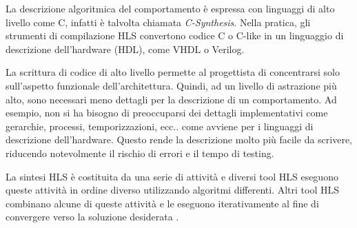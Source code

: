La descrizione algoritmica del comportamento è espressa con linguaggi di alto livello come C, infatti è talvolta chiamata \textit{C-Synthesis}. Nella pratica, gli strumenti di compilazione HLS convertono codice C o C-like in un linguaggio di descrizione dell'hardware (HDL), come VHDL o Verilog. 

La scrittura di codice di alto livello permette al progettista di concentrarsi solo sull'aspetto funzionale dell'architettura. Quindi, ad un livello di astrazione più alto, sono necessari meno dettagli per la descrizione di un comportamento. Ad esempio, non si ha bisogno di preoccuparsi dei dettagli implementativi come gerarchie, processi, temporizzazioni, ecc.. come avviene per i linguaggi di descrizione dell'hardware. Questo rende la descrizione molto più facile da scrivere, riducendo notevolmente il rischio di errori e il tempo di testing. 

La sintesi HLS è costituita da una serie di attività e diversi tool HLS eseguono queste attività in ordine diverso utilizzando algoritmi differenti. Altri tool HLS combinano alcune di queste attività e le eseguono iterativamente al fine di convergere verso la soluzione desiderata \cite{eetimes}.

